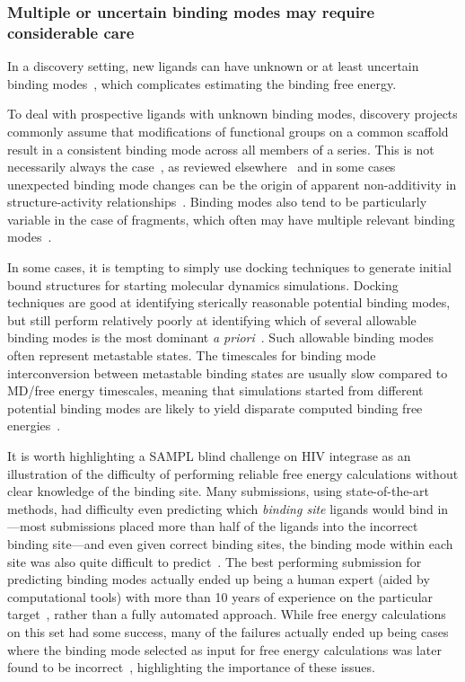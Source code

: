 \documentclass[9pt,bestpractices]{livecoms}
\begin{document}
\subsubsection{Multiple or uncertain binding modes may require considerable care}
\label{sec:multiple_binding_modes}
In a discovery setting, new ligands can have unknown or at least uncertain binding modes~\cite{kaus2015how, plountprice2000analysis,mobley2009binding,calabro2016elucidation}, which complicates estimating the binding free energy.

To deal with prospective ligands with unknown binding modes, discovery projects commonly assume that modifications of functional groups on a common scaffold result in a consistent binding mode across all members of a series.
This is not necessarily always the case~\cite{kaus2015how}, as reviewed elsewhere~\cite{mobley2009binding} and in some cases unexpected binding mode changes can be the origin of apparent non-additivity in structure-activity relationships~\cite{calabro2016elucidation}.
Binding modes also tend to be particularly variable in the case of fragments, which often may have multiple relevant binding modes~\cite{steinbrecher2015accurate}.

In some cases, it is tempting to simply use docking techniques to generate initial bound structures for starting molecular dynamics simulations. Docking techniques are good at identifying sterically reasonable potential binding modes, but still perform relatively poorly at identifying which of several allowable binding modes is the most dominant \emph{a priori}~\cite{macdermott-opeskinComputationalCommunityBlind2026}. Such allowable binding modes often represent metastable states. The timescales for binding mode interconversion between metastable binding states are usually slow compared to MD/free energy timescales, meaning that simulations started from different potential binding modes are likely to yield disparate computed binding free energies~\cite{mobley2006use, palma2012computation, mobley2012perspective, gill2018binding}. 


It is worth highlighting a SAMPL blind challenge on HIV integrase as an illustration of the difficulty of performing reliable free energy calculations without clear knowledge of the binding site. 
Many submissions, using state-of-the-art methods, had difficulty even predicting which \emph{binding site} ligands would bind in---most submissions placed more than half of the ligands into the incorrect binding site---and even given correct binding sites, the binding mode within each site was also quite difficult to predict~\cite{mobley2014blind}.
The best performing submission for predicting binding modes actually ended up being a human expert (aided by computational tools) with more than 10 years of experience on the particular target~\cite{voet2014combining}, rather than a fully automated approach.
While free energy calculations on this set had some success, many of the failures actually ended up being cases where the binding mode selected as input for free energy calculations was later found to be incorrect~\cite{gallicchio2014virtual}, highlighting the importance of these issues.
\end{document}
